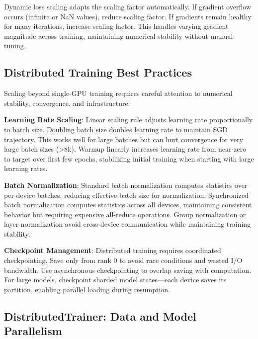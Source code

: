 Dynamic loss scaling adapts the scaling factor automatically. If gradient overflow occurs (infinite or NaN values), reduce scaling factor. If gradients remain healthy for many iterations, increase scaling factor. This handles varying gradient magnitude across training, maintaining numerical stability without manual tuning.

\subsection{Distributed Training Best Practices}

Scaling beyond single-GPU training requires careful attention to numerical stability, convergence, and infrastructure:

\textbf{Learning Rate Scaling}: Linear scaling rule adjusts learning rate proportionally to batch size. Doubling batch size doubles learning rate to maintain SGD trajectory. This works well for large batches but can hurt convergence for very large batch sizes (>8k). Warmup linearly increases learning rate from near-zero to target over first few epochs, stabilizing initial training when starting with large learning rates.

\textbf{Batch Normalization}: Standard batch normalization computes statistics over per-device batches, reducing effective batch size for normalization. Synchronized batch normalization computes statistics across all devices, maintaining consistent behavior but requiring expensive all-reduce operations. Group normalization or layer normalization avoid cross-device communication while maintaining training stability.

\textbf{Checkpoint Management}: Distributed training requires coordinated checkpointing. Save only from rank 0 to avoid race conditions and wasted I/O bandwidth. Use asynchronous checkpointing to overlap saving with computation. For large models, checkpoint sharded model states---each device saves its partition, enabling parallel loading during resumption.

\subsection{DistributedTrainer: Data and Model Parallelism}


